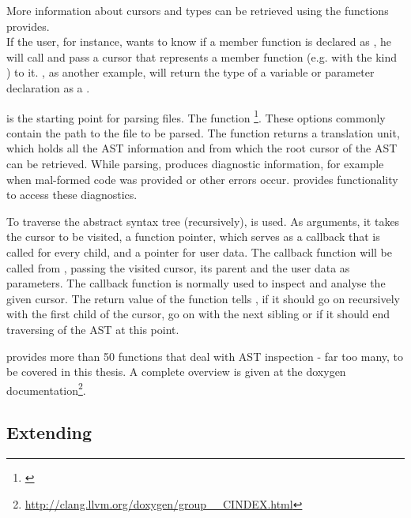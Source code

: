 More information about cursors and types can be retrieved using the functions  provides.
\\If the user, for instance, wants to know if a member function is declared as , he will call  and pass a cursor that represents a member function (e.g. with the kind ) to it. , as another example, will return the type of a variable or parameter declaration as a .

 is the starting point for parsing  files. The function \footnote{\citep{ClangAPIDoc}}. These options commonly contain the path to the file to be parsed. The function returns a translation unit, which holds all the AST information and from which the root cursor of the AST can be retrieved. While parsing,  produces diagnostic information, for example when mal-formed  code was provided or other errors occur.  provides functionality to access these diagnostics.

To traverse the abstract syntax tree (recursively),  is used. As arguments, it takes the cursor to be visited, a function pointer, which serves as a callback that is called for every child, and a  pointer for user data. The callback function will be called from , passing the visited cursor, its parent and the user data as parameters. The callback function is normally used to inspect and analyse the given cursor. The return value of the function tells , if it should go on recursively with the first child of the cursor, go on with the next sibling or if it should end traversing of the AST at this point.

 provides more than 50 functions that deal with AST inspection - far too many, to be covered in this thesis. A complete overview is given at the  doxygen documentation\footnote{\url{http://clang.llvm.org/doxygen/group\_\_CINDEX.html}}.

\subsection{Extending }

